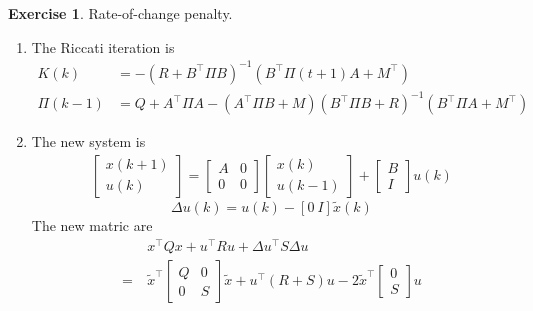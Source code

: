 \documentclass[11pt,a4paper]{report}
\theoremstyle{definition}\newtheorem{exercise}{Exercise}[chapter]
\begin{document}
\begin{exercise}Rate-of-change penalty.\\
\end{exercise}
\begin{answer}
\begin{enumerate}[label=(\alph*)]
    \item The Riccati iteration is \cite{StanfordLQR}
    \begin{align}
        K(k)&=-(R+B^\top \Pi B)^{-1}(B^\top \Pi(t+1)A+M^\top)\\
        \Pi(k-1)&=Q+A^\top\Pi A-(A^\top\Pi B + M)(B^\top\Pi B+R)^{-1}(B^\top\Pi A+M^\top)
    \end{align}
    \item The new system is
    \begin{align}
        \begin{bmatrix}
            x(k+1)\\u(k)
        \end{bmatrix}=
        \begin{bmatrix}
            A &0\\
            0 &0
        \end{bmatrix}
        \begin{bmatrix}
            x(k)\\u(k-1)
        \end{bmatrix}+
        \begin{bmatrix}
            B\\I
        \end{bmatrix}u(k)
    \end{align}
    \begin{equation}
        \Delta u(k)=u(k)-[0~I]\tilde x(k)
    \end{equation}
    The new matric are
    \begin{align}
        &x^\top Qx+u^\top Ru+\Delta u^\top S \Delta u  \\
        =~&\tilde x^\top
        \begin{bmatrix}
            Q &0\\ 0 &S
        \end{bmatrix}
        \tilde x
        +u^\top (R+S)u
        -2\tilde x^\top \begin{bmatrix}0\\S\end{bmatrix} u
    \end{align}
\end{enumerate}
\end{answer}
\end{document}
